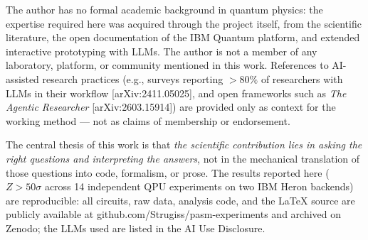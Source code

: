 \documentclass[12pt,a4paper]{article}
\begin{document}
The author has no formal academic background in quantum physics: the expertise required here was acquired through the project itself, from the scientific literature, the open documentation of the IBM Quantum platform, and extended interactive prototyping with LLMs. The author is not a member of any laboratory, platform, or community mentioned in this work. References to AI-assisted research practices (e.g., surveys reporting $>80\%$ of researchers with LLMs in their workflow [arXiv:2411.05025], and open frameworks such as \textit{The Agentic Researcher} [arXiv:2603.15914]) are provided only as context for the working method --- not as claims of membership or endorsement.

The central thesis of this work is that \textit{the scientific contribution lies in asking the right questions and interpreting the answers}, not in the mechanical translation of those questions into code, formalism, or prose. The results reported here ($Z > 50\sigma$ across 14 independent QPU experiments on two IBM Heron backends) are reproducible: all circuits, raw data, analysis code, and the LaTeX source are publicly available at github.com/Strugiss/pasm-experiments and archived on Zenodo; the LLMs used are listed in the AI Use Disclosure.
\end{document}
